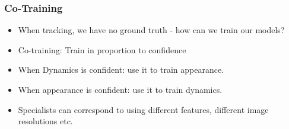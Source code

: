 \documentclass{beamer}
\begin{document}
\begin{frame}
\frametitle{Co-Training}
\begin{itemize}
\item When tracking, we have no ground truth - how can we train our
  models?
\item Co-training: Train in proportion to confidence
\item When Dynamics is confident: use it to train appearance.
\item When appearance is confident: use it to train dynamics.
\item Specialists can correspond to using different features,
  different image resolutions etc.
\end{itemize}
\end{frame}

\end{document}
